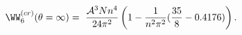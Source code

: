 \begin{equation}
\label{tot}
\WW_6^{(cr)}(\theta=\infty)=\ \frac{{\cal A}^3 N n^4}{24\pi^2}\left(1-\frac{1}{n^2\pi^2}
(\frac{35}{8}-0.4176)\right).
\end{equation}


